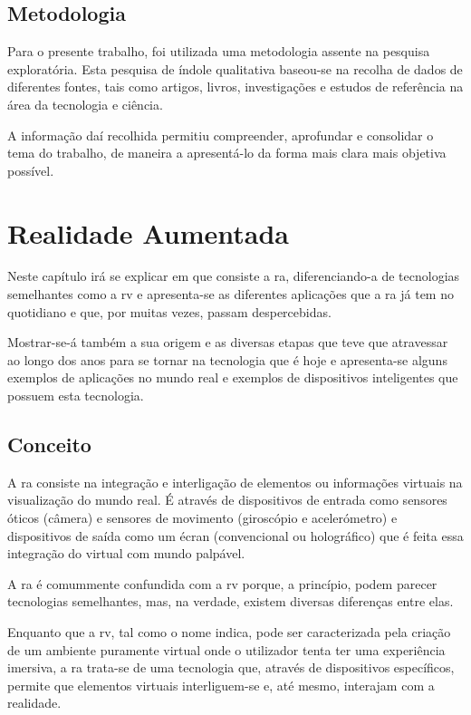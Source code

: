 \documentclass{report}
\begin{document}
\section{Metodologia}
Para o presente trabalho, foi utilizada uma metodologia assente na pesquisa exploratória. Esta pesquisa de índole qualitativa baseou-se na recolha de dados de diferentes fontes, tais como artigos, livros, investigações e estudos de referência na área da tecnologia e ciência.

A informação daí recolhida permitiu compreender, aprofundar e consolidar o tema do trabalho, de maneira a apresentá-lo da forma mais clara mais objetiva possível.

\chapter{Realidade Aumentada}
\label{chap.realidade-aumentada}
Neste capítulo irá se explicar em que consiste a \ac{ra}, diferenciando-a de tecnologias semelhantes como a \ac{rv} e apresenta-se as diferentes aplicações que a \ac{ra} já tem no quotidiano e que, por muitas vezes, passam despercebidas.

Mostrar-se-á também a sua origem e as diversas etapas que teve que atravessar ao longo dos anos para se tornar na tecnologia que é hoje e apresenta-se alguns exemplos de aplicações no mundo real e exemplos de dispositivos inteligentes que possuem esta tecnologia.

\section{Conceito}
A \ac{ra} consiste na integração e interligação de elementos ou informações virtuais na visualização do mundo real. É através de dispositivos de entrada como sensores óticos (câmera) e sensores de movimento (giroscópio e acelerómetro) e dispositivos de saída como um écran (convencional ou holográfico) que é feita essa integração do virtual com mundo palpável.

A \ac{ra} é comummente confundida com a \ac{rv} porque, a princípio, podem parecer tecnologias semelhantes, mas, na verdade, existem diversas diferenças entre elas.

Enquanto que a \ac{rv}, tal como o nome indica, pode ser caracterizada pela criação de um ambiente puramente virtual onde o utilizador tenta ter uma experiência imersiva, a \ac{ra} trata-se de uma tecnologia que, através de dispositivos específicos, permite que elementos virtuais interliguem-se e, até mesmo, interajam com a realidade.
\end{document}
